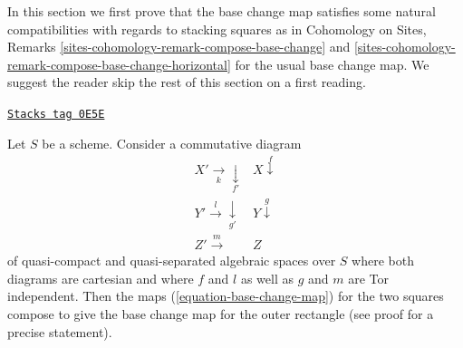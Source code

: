 \medskip\noindent
In this section we first prove that the base change map satisfies
some natural compatibilities with regards to stacking squares as in
Cohomology on Sites, Remarks
\ref{sites-cohomology-remark-compose-base-change} and
\ref{sites-cohomology-remark-compose-base-change-horizontal}
for the usual base change map.
We suggest the reader skip the rest of this section on a first reading.

\begin{lemma}
\label{spaces-duality-lemma-compose-base-change-maps}
\href{https://stacks.math.columbia.edu/tag/0E5E}{\texttt{Stacks tag 0E5E}}

Let $S$ be a scheme. Consider a commutative diagram
$$
\begin{array}{cc}X' \underset{k}{\longrightarrow}\underset{f'}{\downarrow} & X \overset{f}{\downarrow} \\ Y' \overset{l}{\longrightarrow}\underset{g'}{\downarrow} & Y \overset{g}{\downarrow} \\ Z' \overset{m}{\longrightarrow} & Z\end{array}
$$
of quasi-compact and quasi-separated algebraic spaces over $S$ where
both diagrams are cartesian and where $f$ and $l$
as well as $g$ and $m$ are Tor independent.
Then the maps (\ref{equation-base-change-map})
for the two squares compose to give the base
change map for the outer rectangle (see proof for a precise statement).
\end{lemma}

